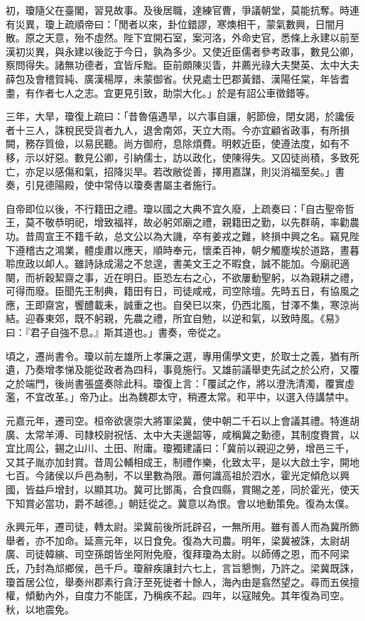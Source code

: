\begin{pinyinscope}
初，瓊隨父在臺閣，習見故事。及後居職，達練官曹，爭議朝堂，莫能抗奪。時連有災異，瓊上疏順帝曰：「閒者以來，卦位錯謬，寒燠相干，蒙氣數興，日闇月散。原之天意，殆不虛然。陛下宜開石室，案河洛，外命史官，悉條上永建以前至漢初災異，與永建以後訖于今日，孰為多少。又使近臣儒者參考政事，數見公卿，察問得失。諸無功德者，宜皆斥黜。臣前頗陳災眚，并薦光祿大夫樊英、太中大夫薛包及會稽賀純、廣漢楊厚，未蒙御省。伏見處士巴郡黃錯、漢陽任棠，年皆耆耋，有作者七人之志。宜更見引致，助崇大化。」於是有詔公車徵錯等。

三年，大旱，瓊復上疏曰：「昔魯僖遇旱，以六事自讓，躬節儉，閉女謁，於讒佞者十三人，誅稅民受貨者九人，退舍南郊，天立大雨。今亦宜顧省政事，有所損闕，務存質儉，以易民聽。尚方御府，息除煩費。明敕近臣，使遵法度，如有不移，示以好惡。數見公卿，引納儒士，訪以政化，使陳得失。又囚徒尚積，多致死亡，亦足以感傷和氣，招降災旱。若改敝從善，擇用嘉謀，則災消福至矣。」書奏，引見德陽殿，使中常侍以瓊奏書屬主者施行。

自帝即位以後，不行籍田之禮。瓊以國之大典不宜久廢，上疏奏曰：「自古聖帝哲王，莫不敬恭明祀，增致福祥，故必躬郊廟之禮，親籍田之勤，以先群萌，率勸農功。昔周宣王不籍千畝，总文公以為大譏，卒有姜戎之難，終損中興之名。竊見陛下遵稽古之鴻業，體虔肅以應天，順時奉元，懷柔百神，朝夕觸塵埃於道路，晝暮聆庶政以卹人。雖詩詠成湯之不怠遑，書美文王之不暇食，誠不能加。今廟祀適闋，而祈穀絜齋之事，近在明日。臣恐左右之心，不欲屢動聖躬，以為親耕之禮，可得而廢。臣聞先王制典，籍田有日，司徒咸戒，司空除壇。先時五日，有協風之應，王即齋宮，饗醴載耒，誠重之也。自癸巳以來，仍西北風，甘澤不集，寒涼尚結。迎春東郊，既不躬親，先農之禮，所宜自勉，以逆和氣，以致時風。《易》曰：『君子自強不息。』斯其道也。」書奏，帝從之。

頃之，遷尚書令。瓊以前左雄所上孝廉之選，專用儒學文吏，於取士之義，猶有所遺，乃奏增孝悌及能從政者為四科，事竟施行。又雄前議舉吏先試之於公府，又覆之於端門，後尚書張盛奏除此科。瓊復上言：「覆試之作，將以澄洗清濁，覆實虛濫，不宜改革。」帝乃止。出為魏郡太守，稍遷太常。和平中，以選入侍講禁中。

元嘉元年，遷司空。桓帝欲褒崇大將軍梁冀，使中朝二千石以上會議其禮。特進胡廣、太常羊溥、司隸校尉祝恬、太中大夫邊韶等，咸稱冀之勳德，其制度賚賞，以宜比周公，錫之山川、土田、附庸。瓊獨建議曰：「冀前以親迎之勞，增邑三千，又其子胤亦加封賞。昔周公輔相成王，制禮作樂，化致太平，是以大啟土宇，開地七百。今諸侯以戶邑為制，不以里數為限。蕭何識高祖於泗水，霍光定傾危以興國，皆益戶增封，以顯其功。冀可比鄧禹，合食四縣，賞賜之差，同於霍光，使天下知賞必當功，爵不越德。」朝廷從之。冀意以為恨。會以地動策免。復為太僕。

永興元年，遷司徒，轉太尉。梁冀前後所託辟召，一無所用。雖有善人而為冀所飾舉者，亦不加命。延熹元年，以日食免。復為大司農。明年，梁冀被誅，太尉胡廣、司徒韓縯、司空孫朗皆坐阿附免廢，復拜瓊為太尉。以師傅之恩，而不阿梁氏，乃封為邟鄉侯，邑千戶。瓊辭疾讓封六七上，言旨懇惻，乃許之。梁冀既誅，瓊首居公位，舉奏州郡素行貪汙至死徙者十餘人，海內由是翕然望之。尋而五侯擅權，傾動內外，自度力不能匡，乃稱疾不起。四年，以寇賊免。其年復為司空。秋，以地震免。


\end{pinyinscope}
